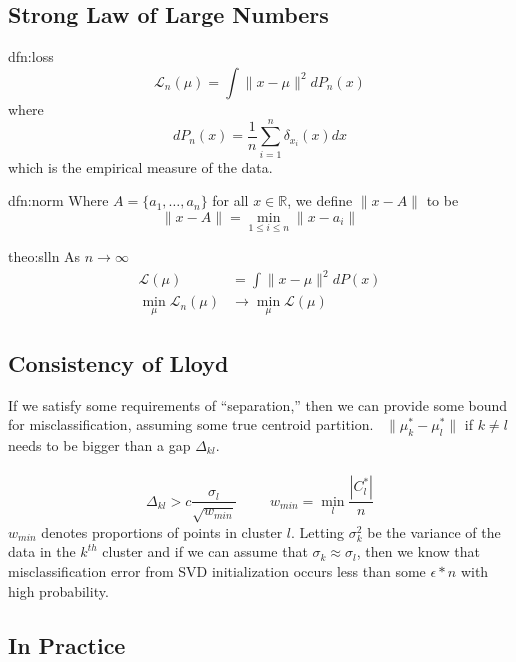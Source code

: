 \documentclass[12pt]{article}
\theoremstyle{plain}
\begin{document}
\subsection{Strong Law of Large Numbers}
\label{subsec:slln}
\begin{dfn}[Loss]{dfn:loss}
	\[
	\mathcal{L}_n (\mu) = \int \| x - \mu \|^2 d P_n(x)
	\]
	where
	\[
	d P_n (x) = \frac{1}{n} \sum_{i = 1}^n \delta_{x_i} (x) dx
	\]
	which is the empirical measure of the data.
\end{dfn}
\begin{dfn}{dfn:norm}
	Where $ A = \{ a_1, \ldots, a_n \} $ for all $ x \in \mathbb{R} $, we define $ \| x - A \| $ to be
	\[
	\| x - A \| = \min_{1 \leq i \leq n} \| x - a_i \|
	\]
\end{dfn}
\begin{theo}{theo:slln}
	As $ n \to \infty $
	\begin{align*}
		\mathcal{L} (\mu) &= \int \| x - \mu \|^2 dP(x) \\
		\min_{\mu} \mathcal{L}_n (\mu) &\to \min_{\mu} \mathcal{L} (\mu)
	\end{align*}
\end{theo}

\subsection{Consistency of Lloyd}
\label{subsec:consistency}
If we satisfy some requirements of ``separation,'' then we can provide some bound for misclassification, assuming some true centroid partition.~\cite{kumar-2010}
$ \| \mu^{*}_{k} - \mu^{*}_{l} \| $ if $ k \neq l $ needs to be bigger than a gap $ \Delta_{kl} $.
\\ \\
\[
\Delta_{kl} > c \frac{\sigma_l}{\sqrt{w_{min}}} \hspace{1cm} w_{min} = \min_{l} \frac{|C_l^{*}|}{n}
\]
$w_{min}$ denotes proportions of points in cluster $l$. Letting $ \sigma_k^2 $ be the variance of the data in the $ k^{th} $ cluster and if we can assume that $ \sigma_k \approx \sigma_l $, then we know that misclassification error from SVD initialization occurs less than some $ \epsilon * n $ with high probability.

\subsection{In Practice}
\label{subsec:inpractice}
\end{document}

